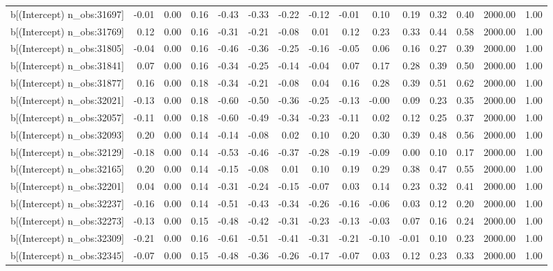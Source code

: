 \begin{table}[ht]
\begin{tabular}{rrrrrrrrrrrrrrr}
  b[(Intercept) n\_obs:31697] & -0.01 & 0.00 & 0.16 & -0.43 & -0.33 & -0.22 & -0.12 & -0.01 & 0.10 & 0.19 & 0.32 & 0.40 & 2000.00 & 1.00 \\ 
  b[(Intercept) n\_obs:31769] & 0.12 & 0.00 & 0.16 & -0.31 & -0.21 & -0.08 & 0.01 & 0.12 & 0.23 & 0.33 & 0.44 & 0.58 & 2000.00 & 1.00 \\ 
  b[(Intercept) n\_obs:31805] & -0.04 & 0.00 & 0.16 & -0.46 & -0.36 & -0.25 & -0.16 & -0.05 & 0.06 & 0.16 & 0.27 & 0.39 & 2000.00 & 1.00 \\ 
  b[(Intercept) n\_obs:31841] & 0.07 & 0.00 & 0.16 & -0.34 & -0.25 & -0.14 & -0.04 & 0.07 & 0.17 & 0.28 & 0.39 & 0.50 & 2000.00 & 1.00 \\ 
  b[(Intercept) n\_obs:31877] & 0.16 & 0.00 & 0.18 & -0.34 & -0.21 & -0.08 & 0.04 & 0.16 & 0.28 & 0.39 & 0.51 & 0.62 & 2000.00 & 1.00 \\ 
  b[(Intercept) n\_obs:32021] & -0.13 & 0.00 & 0.18 & -0.60 & -0.50 & -0.36 & -0.25 & -0.13 & -0.00 & 0.09 & 0.23 & 0.35 & 2000.00 & 1.00 \\ 
  b[(Intercept) n\_obs:32057] & -0.11 & 0.00 & 0.18 & -0.60 & -0.49 & -0.34 & -0.23 & -0.11 & 0.02 & 0.12 & 0.25 & 0.37 & 2000.00 & 1.00 \\ 
  b[(Intercept) n\_obs:32093] & 0.20 & 0.00 & 0.14 & -0.14 & -0.08 & 0.02 & 0.10 & 0.20 & 0.30 & 0.39 & 0.48 & 0.56 & 2000.00 & 1.00 \\ 
  b[(Intercept) n\_obs:32129] & -0.18 & 0.00 & 0.14 & -0.53 & -0.46 & -0.37 & -0.28 & -0.19 & -0.09 & 0.00 & 0.10 & 0.17 & 2000.00 & 1.00 \\ 
  b[(Intercept) n\_obs:32165] & 0.20 & 0.00 & 0.14 & -0.15 & -0.08 & 0.01 & 0.10 & 0.19 & 0.29 & 0.38 & 0.47 & 0.55 & 2000.00 & 1.00 \\ 
  b[(Intercept) n\_obs:32201] & 0.04 & 0.00 & 0.14 & -0.31 & -0.24 & -0.15 & -0.07 & 0.03 & 0.14 & 0.23 & 0.32 & 0.41 & 2000.00 & 1.00 \\ 
  b[(Intercept) n\_obs:32237] & -0.16 & 0.00 & 0.14 & -0.51 & -0.43 & -0.34 & -0.26 & -0.16 & -0.06 & 0.03 & 0.12 & 0.20 & 2000.00 & 1.00 \\ 
  b[(Intercept) n\_obs:32273] & -0.13 & 0.00 & 0.15 & -0.48 & -0.42 & -0.31 & -0.23 & -0.13 & -0.03 & 0.07 & 0.16 & 0.24 & 2000.00 & 1.00 \\ 
  b[(Intercept) n\_obs:32309] & -0.21 & 0.00 & 0.16 & -0.61 & -0.51 & -0.41 & -0.31 & -0.21 & -0.10 & -0.01 & 0.10 & 0.23 & 2000.00 & 1.00 \\ 
  b[(Intercept) n\_obs:32345] & -0.07 & 0.00 & 0.15 & -0.48 & -0.36 & -0.26 & -0.17 & -0.07 & 0.03 & 0.12 & 0.23 & 0.33 & 2000.00 & 1.00 \\ 

\end{tabular}
\end{table}
